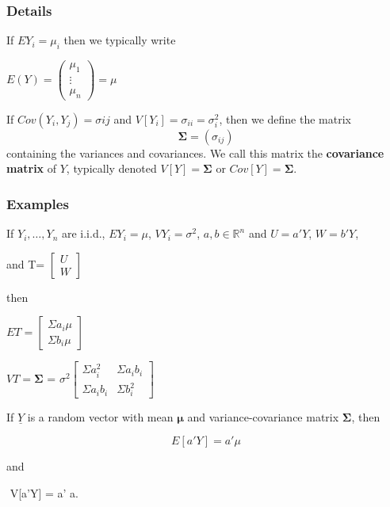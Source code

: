 \documentclass[12pt,a4paper]{article}
\theoremstyle{regla}
\theoremstyle{remark}
\theoremstyle{definition}
\theoremstyle{nonumberbreak}
\begin{document}
\subsubsection{Details}
\begin{defn}
If $EY_i = \mu_i$ then we typically write

$E(Y)=\left(
\begin{array}{ccc}
  \mu_1 \\
  \vdots \\
  \mu_n
\end{array} \right)=\mu$

If $Cov(Y_i, Y_j) = \sigma{ij}$ and $V[Y_i]=\sigma_{ii} = \sigma_i^2$, then we define the matrix $$\boldsymbol{\Sigma} = (\sigma_{ij})$$
containing the variances and covariances. We call this matrix the {\bf covariance matrix} of $Y$, typically denoted $V[Y] = \boldsymbol{\Sigma}$ or $Cov[Y] = \boldsymbol{\Sigma}$.
\end{defn}
\subsubsection{Examples}
\begin{xmpl}
If $Y_i, \ldots , Y_n$ are i.i.d., $EY_i = \mu$, $VY_i = \sigma^2$, $a,b\in\mathbb{R}^n$ and $U=a'Y$, $W=b'Y$,

and T=
$\begin{bmatrix}
U \\
W
\end{bmatrix}$

then

$ET=
\begin{bmatrix}
\Sigma a_i  \mu \\
\Sigma b_i  \mu
\end{bmatrix}$


$VT=
\boldsymbol{\Sigma}$ 
= $\sigma^2
\begin{bmatrix}
\Sigma a_i^2 & \Sigma a_i b_i \\
\Sigma a_ib_i & \Sigma b_i^2
\end{bmatrix}$
\end{xmpl}

\begin{xmpl}

If $\underline{Y}$ is a random vector with mean $\boldsymbol{\mu}$ and variance-covariance matrix 
$\boldsymbol{\Sigma}$, then

$$
E[a'Y] = a'\mu
$$


and 

$$
V[a'Y] = a' \boldsymbol{\Sigma} a.
\end{xmpl}
\end{document}
